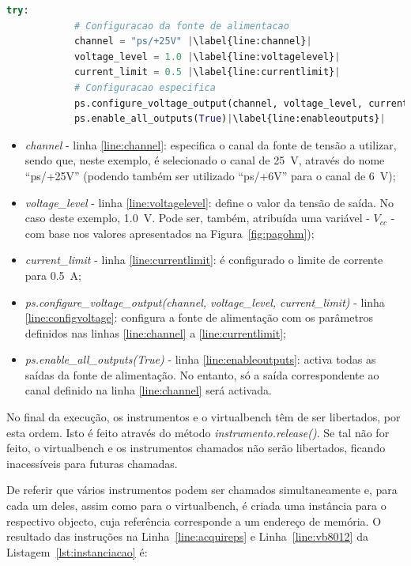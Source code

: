 \begin{minipage}{0.7\linewidth}
	\begin{lstlisting}[language=Python,escapechar=|, caption=Exemplo \textit{ps\_example.py}, label=lst:exemploconfigps]
		try:
			# Configuracao da fonte de alimentacao
			channel = "ps/+25V" |\label{line:channel}| 
			voltage_level = 1.0 |\label{line:voltagelevel}|
			current_limit = 0.5 |\label{line:currentlimit}|
			# Configuracao especifica
			ps.configure_voltage_output(channel, voltage_level, current_limit)|\label{line:configvoltage}|
			ps.enable_all_outputs(True)|\label{line:enableoutputs}|
	\end{lstlisting}
\end{minipage}

\begin{itemize}
	\item \textit{channel} - linha \ref{line:channel}: especifica o canal da fonte de tensão a utilizar, sendo que, neste exemplo, é selecionado o canal de \SI{25}{\volt}, através do nome ``ps/+25V'' (podendo também ser utilizado ``ps/+6V'' para o canal de \SI{6}{\volt});
	\item \textit{voltage\_level} - linha \ref{line:voltagelevel}: define o valor da tensão de saída. No caso deste exemplo, \SI{1,0}{\volt}. Pode ser, também, atribuída uma variável - $V_{cc}$ - com base nos valores apresentados na Figura~\ref{fig:pagohm});
	\item  \textit{current\_limit} - linha \ref{line:currentlimit}: é configurado o limite de corrente para \SI{0,5}{\ampere};
	\item \textit{ps.configure\_voltage\_output(channel, voltage\_level, current\_limit)} - linha \ref{line:configvoltage}: configura a fonte de alimentação com os parâmetros definidos nas linhas \ref{line:channel} a \ref{line:currentlimit};
	\item \textit{ps.enable\_all\_outputs(True)} - linha \ref{line:enableoutputs}: activa todas as saídas da fonte de alimentação. No entanto, só a saída correspondente ao canal definido na linha \ref{line:channel} será activada.
\end{itemize}

No final da execução, os instrumentos e o \acrshort{virtualbench} têm de ser libertados, por esta ordem. Isto é feito através do método \textit{instrumento.release()}. Se tal não for feito, o \acrshort{virtualbench} e os instrumentos chamados não serão libertados, ficando inacessíveis para futuras chamadas. 

De referir que vários instrumentos podem ser chamados simultaneamente e, para cada um deles, assim como para o \acrshort{virtualbench}, é criada uma instância para o respectivo objecto, cuja referência corresponde a um endereço de memória. O resultado das instruções na Linha~\ref{line:acquireps} e Linha~\ref{line:vb8012} da Listagem~\ref{lst:instanciacao} é:

